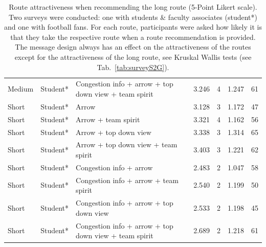 \begin{table}[H]
\begin{scriptsize}
\begin{tabular}{lllrrrr}
   Medium & Student* & Congestion info + arrow + top down view + team spirit & 3.246 & 4 & 1.247 & 61 \\
   Short & Student* & Arrow & 3.128 & 3 & 1.172 & 47 \\
   Short & Student* & Arrow + team spirit & 3.321 & 4 & 1.162 & 56 \\
   Short & Student* & Arrow + top down view & 3.338 & 3 & 1.314 & 65 \\
   Short & Student* & Arrow + top down view + team spirit & 3.403 & 3 & 1.221 & 62 \\
   Short & Student* & Congestion info + arrow & 2.483 & 2 & 1.047 & 58 \\
   Short & Student* & Congestion info + arrow + team spirit & 2.540 & 2 & 1.199 & 50 \\
   Short & Student* & Congestion info + arrow + top down view & 2.533 & 2 & 1.198 & 45 \\
   Short & Student* & Congestion info + arrow + top down view + team spirit & 2.689 & 2 & 1.218 & 61 \\
   \hline
\end{tabular}
\end{scriptsize}
\caption{Route attractiveness when recommending the long route (5-Point Likert scale). Two surveys were conducted: one with students \&  faculty associates (student*) and one with football fans.
For each route, participants were asked how likely it is that they take the respective route when a route recommendation is provided. The message design always has an effect on the attractiveness of the routes except for the attractiveness of the long route, see Kruskal Wallis tests (see Tab.~\ref{tab:surveyS2G}).}
\label{tab:surveyS2H}
\end{table}




\pagestyle{empty}


